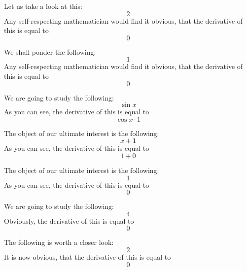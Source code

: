 \documentclass{article}
\begin{document}
Let us take a look at this:
\begin{equation}
2 
\end{equation}
Any self-respecting mathematician would find it obvious, that the derivative of this is equal to
\begin{equation}
0 
\end{equation}

We shall ponder the following:
\begin{equation}
1 
\end{equation}
Any self-respecting mathematician would find it obvious, that the derivative of this is equal to
\begin{equation}
0 
\end{equation}

We are going to study the following:
\begin{equation}
\sin x 
\end{equation}
As you can see, the derivative of this is equal to
\begin{equation}
\cos x \cdot 1 
\end{equation}

The object of our ultimate interest is the following:
\begin{equation}
x + 1 
\end{equation}
As you can see, the derivative of this is equal to
\begin{equation}
1 + 0 
\end{equation}

The object of our ultimate interest is the following:
\begin{equation}
1 
\end{equation}
As you can see, the derivative of this is equal to
\begin{equation}
0 
\end{equation}

We are going to study the following:
\begin{equation}
4 
\end{equation}
Obviously, the derivative of this is equal to
\begin{equation}
0 
\end{equation}

The following is worth a closer look:
\begin{equation}
2 
\end{equation}
It is now obvious, that the derivative of this is equal to
\begin{equation}
0 
\end{equation}
\end{document}

